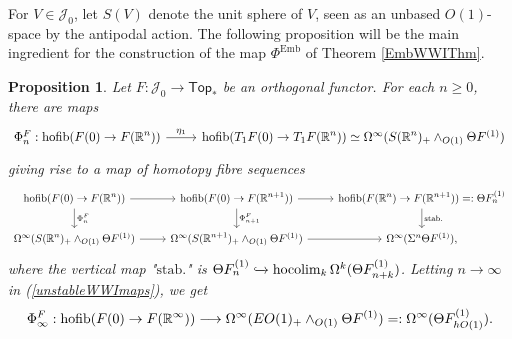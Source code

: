 \documentclass[a4paper, oneside]{amsart}
\newcommand{\emb}{\operatorname{Emb}}
\newcommand{\hofib}{\operatorname{hofib}}
\newcommand{\1}{\mathds{1}}
\newtheorem{prop}[thm]{Proposition}
\theoremstyle{remark}
\theoremstyle{definition}
\newcommand{\R}{{\scaleobj{0.97}{\mathbb{R}}}}
\numberwithin{equation}{section}
\begin{document}
For $V\in \mathcal J_0$, let $S(V)$ denote the unit sphere of $V$, seen as an unbased $O(1)$-space by the antipodal action. The following proposition will be the main ingredient for the construction of the map $\Phi^{\emb}$ of Theorem \ref{EmbWWIThm}.

\begin{prop}\label{propunstablemapsorthcalc}
Let $F: \mathcal J_0\to \mathsf{Top}_*$ be an orthogonal functor. For each $n\geq 0$, there are maps
\begin{equation}\label{unstableWWImaps}
\begin{tikzcd}
    \Phi_n^F: \hofib(F(0)\to F(\R^n))\rar["\eta_1"] &\hofib(T_1F(0)\to T_1F(\R^n))\simeq \Omega^\infty(S(\R^n)_+\wedge_{O(1)}\Theta F^{(1)})
\end{tikzcd}
\end{equation}
giving rise to a map of homotopy fibre sequences
$$
\begin{tikzcd}
    \hofib(F(0)\to F(\R^n))\rar\dar["\Phi_n^F"] &\hofib(F(0)\to F(\R^{n+1}))\rar\dar["\Phi_{n+1}^F"] &\hofib(F(\R^n)\to F(\R^{n+1}))=:\Theta F^{(1)}_n\dar["\mathrm{stab.}"] \\
    \Omega^\infty(S(\R^n)_+\wedge_{O(1)}\Theta F^{(1)})\rar & \Omega^\infty(S(\R^{n+1})_+\wedge_{O(1)}\Theta F^{(1)})\rar & \Omega^\infty(\Sigma^n\Theta F^{(1)}),
\end{tikzcd}
$$
where the vertical map "$\mathrm{stab.}$" is $\Theta F^{(1)}_n\xhookrightarrow{}\operatorname{hocolim}_k\Omega^k(\Theta F^{(1)}_{n+k})$. Letting $n\to \infty$ in (\ref{unstableWWImaps}), we get
\begin{equation}\label{stableWWImaps}
   \Phi^F_\infty: \hofib(F(0)\to F(\R^\infty))\longrightarrow \Omega^\infty(EO(1)_+\wedge_{O(1)}\Theta F^{(1)})=:\Omega^\infty(\Theta F^{(1)}_{hO(1)}). 
\end{equation}
\end{prop}
\end{document}

